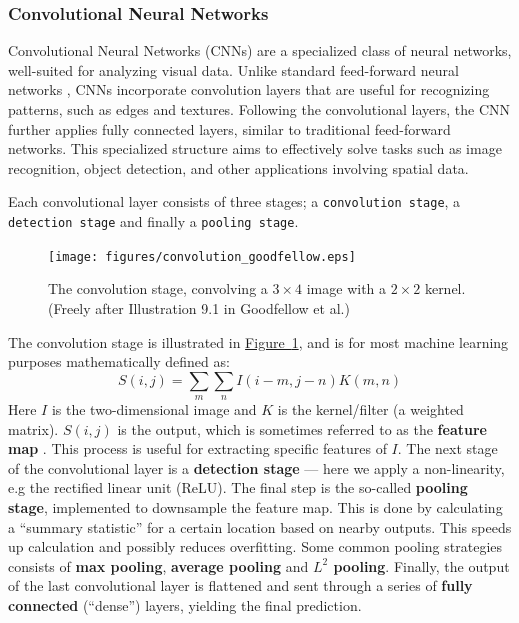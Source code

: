 \documentclass{article}
\begin{document}
\begin{multicols}{2}
\subsubsection*{Convolutional Neural Networks}
Convolutional Neural Networks (CNNs) are a specialized class of neural networks, well-suited for analyzing visual data. Unlike standard feed-forward neural networks \cite{brovold_less_2024}, CNNs incorporate convolution layers that are useful for recognizing patterns, such as edges and textures. Following the convolutional layers, the CNN further applies fully connected layers, similar to traditional feed-forward networks. This specialized structure aims to effectively solve tasks such as image recognition, object detection, and other applications involving spatial data. \cite{goodfellow_deep_2016}

Each convolutional layer consists of three stages; a \texttt{convolution stage}, a \texttt{detection stage} and finally a \texttt{pooling stage}.

\begin{figure}[H]
    \centering
    \texttt{[image: figures/convolution\_goodfellow.eps]} 
    \caption{The convolution stage, convolving a $3\times 4$ image with a $2\times 2$ kernel. (Freely after Illustration 9.1 in Goodfellow et al.\cite{goodfellow_deep_2016})}
    \label{fig:convolution}
\end{figure}

The convolution stage is illustrated in \hyperref[fig:convolution]{Figure~\ref*{fig:convolution}}, and is for most machine learning purposes mathematically defined as:
$$S(i, j) = \sum_m \sum_n I(i-m, j-n) K(m, n)$$
Here $I$ is the two-dimensional image and $K$ is the kernel/filter (a weighted matrix). $S(i, j)$ is the output, which is sometimes referred to as the \textbf{feature map} \cite{goodfellow_deep_2016}. This process is useful for extracting specific features of $I$. The next stage of the convolutional layer is a \textbf{detection stage} — here we apply a non-linearity, e.g the rectified linear unit (ReLU). The final step is the so-called \textbf{pooling stage}, implemented to downsample the feature map. This is done by calculating a ``summary statistic'' for a certain location based on nearby outputs. This speeds up calculation and possibly reduces overfitting. Some common pooling strategies consists of \textbf{max pooling}, \textbf{average pooling} and \textbf{$L^2$ pooling}. Finally, the output of the last convolutional layer is flattened and sent through a series of \textbf{fully connected} (``dense'') layers, yielding the final prediction.
\cite{goodfellow_deep_2016}


\end{multicols}
\end{document}
